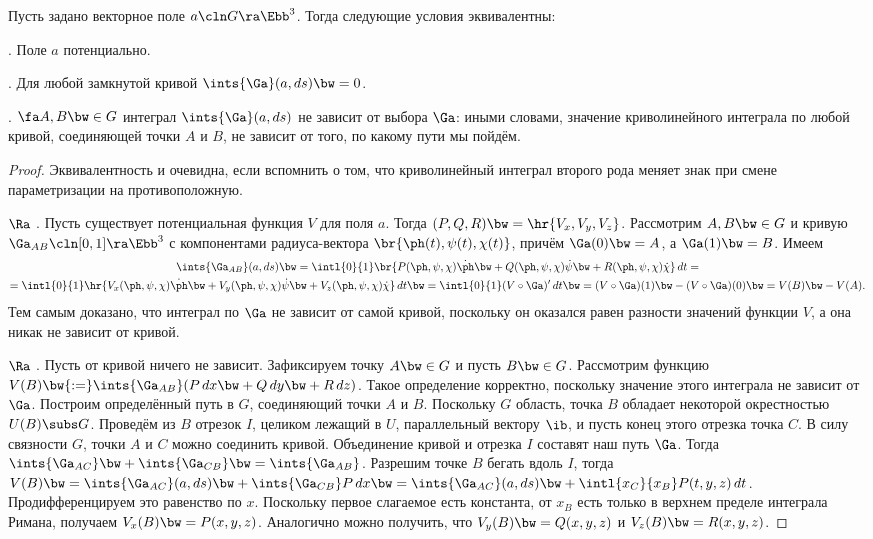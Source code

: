 \documentclass[a4paper]{article}
\begin{document}
\begin{theorem}
Пусть задано векторное поле $a\cln G\ra \Ebb^3$. Тогда следующие условия эквивалентны:

. Поле $a$ потенциально.

. Для любой замкнутой кривой $\ints{\Ga}(a,ds) \bw= 0$.

. $\fa A, B \bw\in G$ интеграл $\ints{\Ga}(a,ds)$ не зависит от выбора $\Ga$: иными словами,
значение криволинейного интеграла по любой кривой, соединяющей точки $A$ и $B$, не зависит от того, по какому
пути мы пойдём.
\end{theorem}
\begin{proof}
Эквивалентность  и  очевидна, если вспомнить о том, что криволинейный интеграл второго
рода меняет знак при смене параметризации на противоположную.

 $\Ra$ . Пусть существует потенциальная функция $V$ для поля $a$. Тогда
$(P, Q, R) \bw= \hr{V_x, V_y, V_z}$. Рассмотрим $A, B \bw\in G$ и кривую
$\Ga_{AB} \cln [0,1] \ra \Ebb^3$ с компонентами радиуса-вектора $\br{\ph(t), \psi(t),\chi(t)}$,
причём $\Ga(0) \bw= A$, а $\Ga(1) \bw= B$. Имеем
\begin{multline*}
\ints{\Ga_{AB}}(a, ds) \bw=
\intl{0}{1}\br{P(\ph,\psi,\chi)\dot{\ph} \bw+ Q(\ph,\psi,\chi)\dot{\psi} \bw+
               R(\ph,\psi,\chi)\dot{\chi}}\,d t =\\=
\intl{0}{1}\hr{V_x(\ph,\psi,\chi)\dot{\ph} \bw+ V_y(\ph,\psi,\chi)\dot{\psi} \bw+
               V_z(\ph,\psi,\chi)\dot{\chi}}\,d t\bw=
\intl{0}{1}(V\circ\Ga)'\,d t \bw= (V\circ\Ga)(1) \bw- (V\circ\Ga)(0) \bw= V(B)\bw-V(A).
\end{multline*}
Тем самым доказано,
что интеграл по $\Ga$ не зависит от самой кривой, поскольку он оказался равен разности значений функции $V$,
а она никак не зависит от кривой.

 $\Ra$ . Пусть от кривой ничего не зависит. Зафиксируем точку $A \bw\in G$ и пусть $B \bw\in G$.
Рассмотрим функцию $V(B) \bw{:=} \ints{\Ga_{AB}}(P\,d x \bw+ Q\,d y \bw+ R\,d z)$. Такое определение
корректно, поскольку значение этого интеграла не зависит от $\Ga$. Построим определённый путь в $G$,
соединяющий точки $A$ и $B$. Поскольку $G$ область, точка $B$ обладает некоторой окрестностью $U(B) \subs
G$. Проведём из $B$ отрезок $I$, целиком лежащий в $U$, параллельный вектору $\ib$, и пусть конец этого
отрезка точка $C$. В силу связности $G$, точки $A$ и $C$ можно соединить кривой. Объединение кривой и
отрезка $I$ составят наш путь $\Ga$. Тогда $\ints{\Ga_{AC}} \bw+ \ints{\Ga_{CB}} \bw= \ints{\Ga_{AB}}$.
Разрешим точке $B$ бегать вдоль $I$, тогда $V(B) \bw= \ints{\Ga_{AC}}(a,d s) \bw+ \ints{\Ga_{CB}}P\,dx
\bw= \ints{\Ga_{AC}}(a,ds) \bw+ \intl{x_C}{x_B}P(t,y,z)\,dt$. Продифференцируем это равенство по $x$.
Поскольку первое слагаемое есть константа, от $x_B$ есть только в верхнем пределе интеграла Римана, получаем
$V_x(B) \bw= P(x,y,z)$. Аналогично можно получить, что $V_y(B) \bw= Q(x,y,z)$ и $V_z(B) \bw= R(x,y,z)$.
\end{proof}
\end{document}
